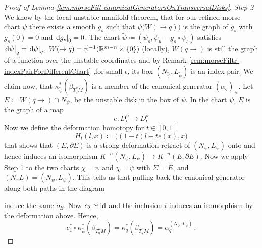 \begin{proof}[Proof of Lemma \ref{lem:morseFilt-canonicalGeneratorsOnTransversalDisks}]
\textit{Step 2} We know by the local unstable manifold theorem, that for our refined morse chart $\psi$ there exists a smooth $g_s$ such that $\psi \big(W(\to q)\big)$ is the graph of $g_s$ with $g_s(0)=0$ and $\left.\mathop{}\!\mathrm{d} g_s \right|_{0}=0$. The chart $\tilde{\psi}\coloneq (\psi_s,\psi_u-g_s\circ \psi_s)$ satisfies $\left.\mathop{}\!\mathrm{d} \tilde{\psi}\right|_{q}=\left.\mathop{}\!\mathrm{d} \psi\right|_{q}$, $W(\to q)=\tilde{\psi}^{-1}(\mathbb{R}^{m-n}\times \{0\})$ (locally), $W(q\to)$ is still the graph of a function over the unstable coordinates and by Remark \ref{rem:morseFiltr-indexPairForDifferentChart} ,for small $\epsilon$, its box $(N_{\tilde{\psi}},L_{\tilde{\psi}})$ is an index pair. We claim now, that $\kappa_{\tilde{\psi}}^*(\beta_{T^u_qM})$ is a member of the canonical generator $(\alpha_q)_{\#}$.
Let $E\coloneq W(q\to)\cap N_\psi$, be the unstable disk in the box of $\psi$. In the chart $\psi$, $E$ is the graph of a map 
\begin{equation*}
	e:D^u_\epsilon\to D^s_\epsilon 
\end{equation*}   Now we define the deformation homotopy for $t\in[0,1]$
\begin{equation*}
	H_t(l,x)\coloneq \big((1-t)l+te(x),x\big)
\end{equation*} that shows that $(E,\partial E)$ is a strong deformation retract of $(N_\psi,L_\psi)$ onto and hence induces an isomorphism $K^{-n}(N_\psi,L_\psi)\to K^{-n}(E,\partial E)$.
Now we apply Step 1 to the two charts $\chi=\psi$ and $\chi=\tilde{\psi}$ with $\Sigma=E$, and $(N,L)=(N_\psi,L_\psi)$. This tells us that pulling back the canonical generator along both paths in the diagram 
\begin{center}
\end{center} induce the same $o_E$. Now $c_2\simeq \operatorname{\mathrm{id}}$ and the inclusion $i$ induces an isomorphism by the deformation above. Hence, 
\begin{equation*}
	c_1^*\circ \kappa_{\tilde{\psi}}^*(\beta_{T^u_qM})=\kappa_q^*(\beta_{T^u_qM})=\alpha_q^{(N_\psi,L_\psi)}\,.
\end{equation*}


\end{proof}
